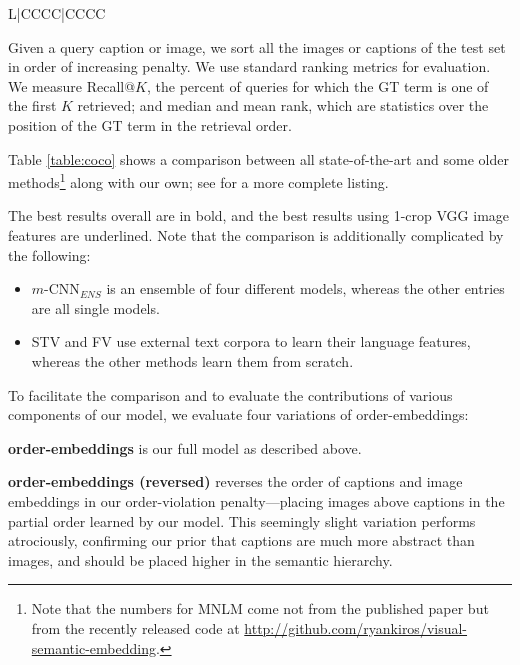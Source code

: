 \documentclass{article} \usepackage{iclr2016_conference,times}
\begin{document}
\begin{table*}[t]
\begin{tabulary}{\linewidth}{L|CCCC|CCCC}
	\end{tabulary}
	\caption{{ Results of caption-image retrieval evaluation on COCO. \textbf{R@K} is Recall@K, in \%. \textbf{Med} {\it r} is median rank. Metrics for our models on 1k test images are averages over five 1000-image splits of the 5000-image test set, as in \citep{klein2015fisher}. Best results overall are in bold; best results using 1-crop VGG features are underlined.}}
	\label{table:coco}
\end{table*}
Given a query caption or image, we sort all the images or captions of the test set in order of increasing penalty. We use standard ranking metrics for evaluation. We measure Recall@$K$, the percent of queries for which the GT term is one of the first $K$ retrieved; and median and mean rank, which are statistics over the position of the GT term in the retrieval order. 

Table \ref{table:coco} shows a comparison between all state-of-the-art  and some older methods\footnote{Note that the numbers for MNLM come not from the published paper but from the recently released code at \url{http://github.com/ryankiros/visual-semantic-embedding}.} along with our own; see \citet{ma2015multimodal} for a more complete listing. 

The best results overall are in bold, and the best results using 1-crop VGG image features are underlined. Note that the comparison is additionally complicated by the following:
\begin{itemize}
	\item $m$-CNN$_{ENS}$ is an ensemble of four different models, whereas the other entries are all single models.
	\item STV and FV use external text corpora to learn their language features, whereas the other methods learn them from scratch.
\end{itemize}

To facilitate the comparison and to evaluate the contributions of various components of our model, we evaluate four variations of order-embeddings: 

\textbf{order-embeddings} is our full model as described above.

\textbf{order-embeddings (reversed)} reverses the order of captions and image embeddings in our order-violation penalty---placing images above captions in the partial order learned by our model. This seemingly slight variation performs atrociously, confirming our prior that captions are much more abstract than images, and should be placed higher in the semantic hierarchy.
\end{document}
